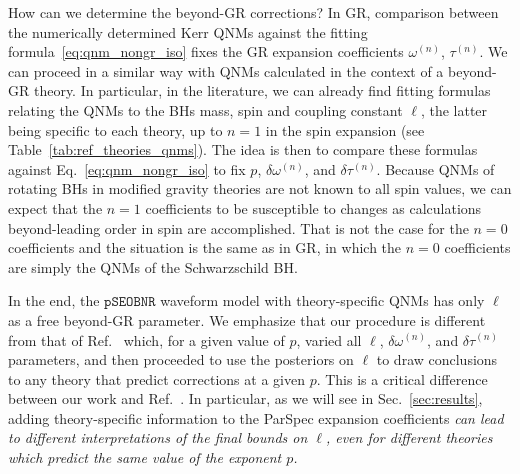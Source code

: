 \documentclass[twocolumn,
               prd,
               aps,
               superscriptaddress,
               tightenlines,
               nofootinbib,
               eqsecnum,
               amsfonts,
               amsmath,
               longbibliography]{revtex4-1}
\newcommand{\pSEOB}{\texttt{pSEOBNR}}
\begin{document}
How can we determine the beyond-GR corrections? In GR, comparison between the numerically determined
Kerr QNMs against the fitting formula~\eqref{eq:qnm_nongr_iso} fixes the GR expansion coefficients
$\omega^{(n)}$, $\tau^{(n)}$.
%
We can proceed in a similar way with QNMs calculated in the context of a beyond-GR theory.
%
In particular, in the literature, we can already find fitting formulas relating
the QNMs to the BHs mass, spin and coupling constant $\ell$, the latter being
specific to each theory, up to $n=1$ in the spin expansion (see Table~\ref{tab:ref_theories_qnms}).
%
The idea is then to compare these formulas against Eq.~\eqref{eq:qnm_nongr_iso}
to fix $p$, $\delta\omega^{(n)}$, and $\delta\tau^{(n)}$.
%
Because QNMs of rotating BHs in modified gravity theories are not known to
all spin values, we can expect that the $n=1$ coefficients to be susceptible to
changes as calculations beyond-leading order in spin are accomplished.
%
That is not the case for the $n=0$ coefficients and the situation is the same as in GR,
in which the $n=0$ coefficients are simply the QNMs of the Schwarzschild BH.

In the end, the $\pSEOB$ waveform model with theory-specific
QNMs has only $\ell$ as a free beyond-GR parameter.
%
We emphasize that our procedure is different from that of
Ref.~\cite{Carullo:2021dui} which, for a given value of $p$, varied all $\ell$,
$\delta\omega^{(n)}$, and $\delta\tau^{(n)}$ parameters, and then proceeded
to use the posteriors on $\ell$ to draw conclusions to any theory that predict
corrections at a given $p$.
%
This is a critical difference between our work and Ref.~\cite{Carullo:2021dui}.
In particular, as we will see in Sec.~\ref{sec:results}, adding theory-specific
information to the ParSpec expansion coefficients \emph{can lead to different interpretations
of the final bounds on $\ell$, even for different theories which predict the same value of the exponent $p$.}
\end{document}
